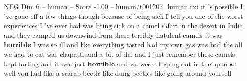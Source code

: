 \begin{textsample}{NEG Dim 6 – human – Score -1.00 – human/t001207\_human.txt}  \label{ex:f6_neg_040}
it 's possible I 've gone off a few things though because of being sick I tell you one of the worst experiences I 've ever had was being sick on a camel safari in the desert in India and they camped us downwind from these terribly flatulent camels it was \textbf{horrible} I was so ill and like everything tasted bad my own gas was bad the all we had to eat was chapatti and a bit of dal and I just remember these camels kept farting and it was just \textbf{horrible} and we were sleeping out in the open as well you had like a scarab beetle like dung beetles like going around yourself

\end{textsample}
